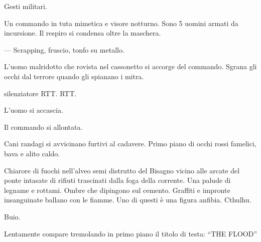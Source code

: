 \documentclass{screenplay}
\begin{document}
Gesti militari.

Un commando in tuta mimetica e visore notturno. Sono 5 uomini armati da incursione. Il respiro si condensa 
oltre la maschera.

\begin{dialogue}{---}
Scrapping, fruscio, tonfo su metallo.
\end{dialogue}

L'uomo malridotto che rovista nel cassonetto si accorge del commando. Sgrana gli occhi dal terrore quando gli spianano i mitra.

\begin{dialogue}{silenziatore}
RTT. RTT.
\end{dialogue}

L'uomo si accascia. 

Il commando si allontata. 

Cani randagi si avvicinano furtivi al cadavere. Primo piano di occhi rossi famelici, bava e alito caldo.

Chiarore di fuochi nell'alveo semi distrutto del Bisagno vicino alle arcate del ponte intasate di rifiuti trascinati 
dalla foga della corrente. Una palude di legname e rottami. Ombre che dipingono sul cemento. Graffiti e impronte insanguinate ballano con le fiamme. Uno di questi \`{e} una figura anfibia. Cthulhu.

Buio. 


\fadeout
Lentamente compare tremolando in primo piano il titolo di testa: ``THE FLOOD''

\theend
\end{document}
